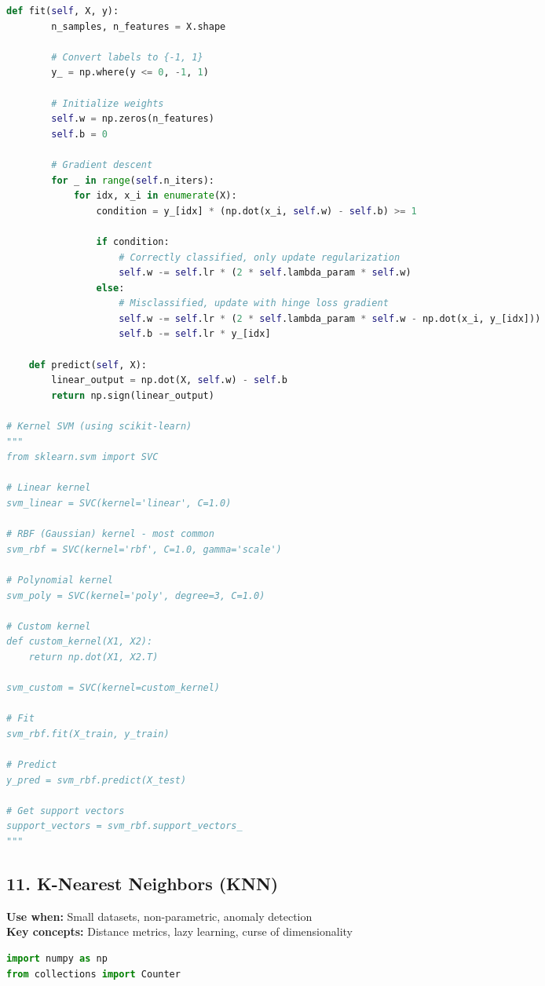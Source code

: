 \documentclass[8pt,landscape]{article}
\begin{document}
\begin{multicols}{3}
\begin{lstlisting}[language=Python]
    def fit(self, X, y):
        n_samples, n_features = X.shape

        # Convert labels to {-1, 1}
        y_ = np.where(y <= 0, -1, 1)

        # Initialize weights
        self.w = np.zeros(n_features)
        self.b = 0

        # Gradient descent
        for _ in range(self.n_iters):
            for idx, x_i in enumerate(X):
                condition = y_[idx] * (np.dot(x_i, self.w) - self.b) >= 1

                if condition:
                    # Correctly classified, only update regularization
                    self.w -= self.lr * (2 * self.lambda_param * self.w)
                else:
                    # Misclassified, update with hinge loss gradient
                    self.w -= self.lr * (2 * self.lambda_param * self.w - np.dot(x_i, y_[idx]))
                    self.b -= self.lr * y_[idx]

    def predict(self, X):
        linear_output = np.dot(X, self.w) - self.b
        return np.sign(linear_output)

# Kernel SVM (using scikit-learn)
"""
from sklearn.svm import SVC

# Linear kernel
svm_linear = SVC(kernel='linear', C=1.0)

# RBF (Gaussian) kernel - most common
svm_rbf = SVC(kernel='rbf', C=1.0, gamma='scale')

# Polynomial kernel
svm_poly = SVC(kernel='poly', degree=3, C=1.0)

# Custom kernel
def custom_kernel(X1, X2):
    return np.dot(X1, X2.T)

svm_custom = SVC(kernel=custom_kernel)

# Fit
svm_rbf.fit(X_train, y_train)

# Predict
y_pred = svm_rbf.predict(X_test)

# Get support vectors
support_vectors = svm_rbf.support_vectors_
"""
\end{lstlisting}

\subsection*{11. K-Nearest Neighbors (KNN)}
\textbf{Use when:} Small datasets, non-parametric, anomaly detection \\
\textbf{Key concepts:} Distance metrics, lazy learning, curse of dimensionality
\begin{lstlisting}[language=Python]
import numpy as np
from collections import Counter


\end{lstlisting}
\end{multicols}
\end{document}

